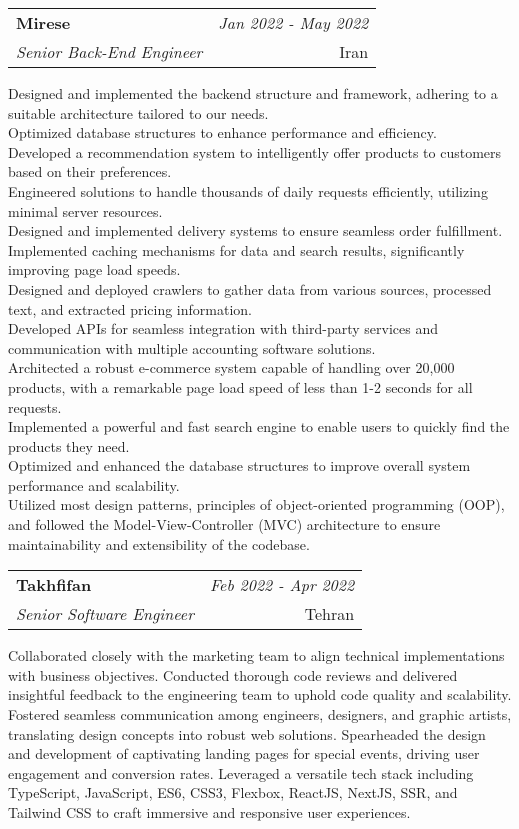 \documentclass[a4paper,10pt]{article}
\makeatletter
\newcommand{\resumeSubheading}[4]{
	\vspace{0.5mm}\item
	\begin{tabular*}{0.98\textwidth}[t]{l@{\extracolsep{\fill}}r}
		\textbf{#1} & \textit{\footnotesize{#4}} \\
		\textit{\footnotesize{#3}} &  \footnotesize{#2}\\
	\end{tabular*}
	\vspace{-2.4mm}
}
\newcommand{\resumeItemListStart}{\begin{justify}\begin{itemize}[leftmargin=3ex, rightmargin=2ex, noitemsep,labelsep=1.2mm,itemsep=0mm]\small}
\newcommand{\resumeItemListEnd}{\end{itemize}\end{justify}\vspace{-2mm}}
\makeatother
\begin{document}
\vspace{-1mm}
\resumeSubheading
{Mirese}{Iran}
{Senior Back-End Engineer}{Jan 2022 - May 2022}
\resumeItemListStart
Designed and implemented the backend structure and framework, adhering to a suitable architecture tailored to our needs. \\
Optimized database structures to enhance performance and efficiency. \\
Developed a recommendation system to intelligently offer products to customers based on their preferences. \\
Engineered solutions to handle thousands of daily requests efficiently, utilizing minimal server resources. \\
Designed and implemented delivery systems to ensure seamless order fulfillment. \\
Implemented caching mechanisms for data and search results, significantly improving page load speeds. \\
Designed and deployed crawlers to gather data from various sources, processed text, and extracted pricing information. \\
Developed APIs for seamless integration with third-party services and communication with multiple accounting software solutions. \\
Architected a robust e-commerce system capable of handling over 20,000 products, with a remarkable page load speed of less than 1-2 seconds for all requests. \\
Implemented a powerful and fast search engine to enable users to quickly find the products they need. \\
Optimized and enhanced the database structures to improve overall system performance and scalability. \\
Utilized most design patterns, principles of object-oriented programming (OOP), and followed the Model-View-Controller (MVC) architecture to ensure maintainability and extensibility of the codebase.
\resumeItemListEnd

\vspace{-1mm}
\resumeSubheading
{Takhfifan}{Tehran}
{Senior Software Engineer}{Feb 2022 - Apr 2022}
\resumeItemListStart
Collaborated closely with the marketing team to align technical implementations with business objectives. Conducted thorough code reviews and delivered insightful feedback to the engineering team to uphold code quality and scalability. Fostered seamless communication among engineers, designers, and graphic artists, translating design concepts into robust web solutions. Spearheaded the design and development of captivating landing pages for special events, driving user engagement and conversion rates. Leveraged a versatile tech stack including TypeScript, JavaScript, ES6, CSS3, Flexbox, ReactJS, NextJS, SSR, and Tailwind CSS to craft immersive and responsive user experiences.
\resumeItemListEnd
\end{document}
